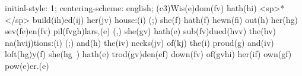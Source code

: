 initial-style: 1;
centering-scheme: english;
(c3)Wis(e)dom(fv) hath(hi) <sp>*</sp> build(ih)ed(ij) her(jv) house:(i) (;) she(f) hath(f) hewn(fi) out(h) her(hg) sev(fe)en(fv) pil(fvgh)lars,(e) (,) she(gv) hath(e) sub(fv)dued(hvv) the(hv) na(hvij)tions:(i) (;) and(h) the(iv) necks(jv) of(kj) the(i) proud(g) and(iv) loft(hg)y(f) she(hg~) hath(e) trod(gv)den(ef) down(fv) of(gvhi) her(if) own(gf) pow(e)er.(e)
